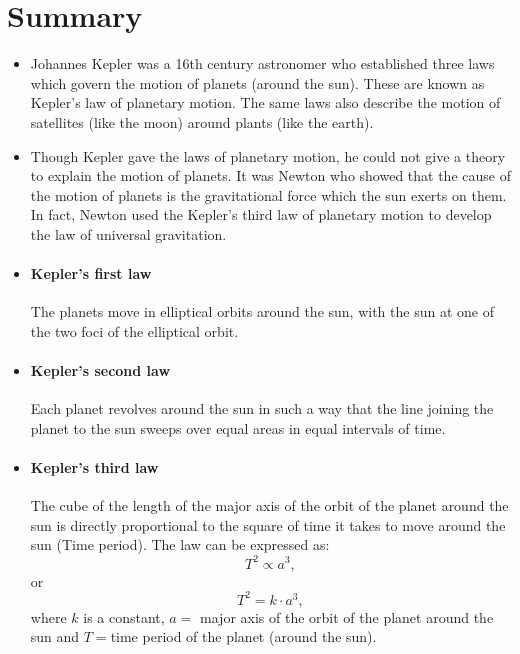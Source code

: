 \documentclass[a4paper]{report}
\begin{document}
\section{Summary}
\begin{itemize}
  \item Johannes Kepler was a 16th century astronomer who established three laws which govern the motion 
    of planets (around the sun). These are known as Kepler’s law of planetary motion. The same laws also 
    describe the motion of satellites (like the moon) around plants (like the earth).

  \item Though Kepler gave the laws of planetary motion, he could not give a theory to explain the motion of  
    planets. It was Newton who showed that the cause of the motion of planets is the gravitational force which 
    the sun exerts on them. In fact, Newton used the Kepler’s third law of planetary motion to develop the law  
    of universal gravitation.
  \item[]
    \paragraph*{Kepler’s first law}
    The planets move in elliptical orbits around the sun, with the sun at one of the two 
    foci of the elliptical orbit. 

  \item[]
    \paragraph*{Kepler’s second law} 
    Each planet revolves around the sun in such a way that the line joining the planet to the sun sweeps over 
    equal areas in equal intervals of time.

  \item[]
    \paragraph*{Kepler’s third law} 
    The cube of the length of the major axis of the orbit of the planet around the sun is directly proportional to 
    the square of time it takes to move around the sun (Time period). The law can be expressed as: 
    $$T^2\propto a^3,$$ or $$T^2=k\cdot a^3,$$ where $k$ is a constant, $a =$ major axis of the orbit of the 
    planet around the sun and $T = $time period of the planet 
    (around the sun). 

\end{itemize}
\end{document}
